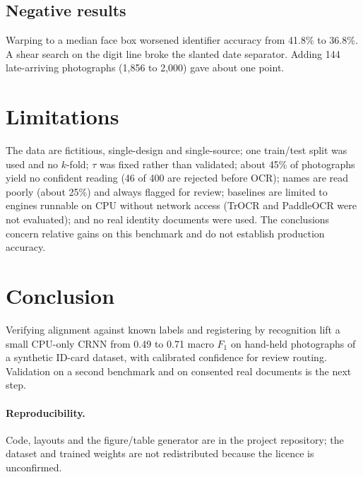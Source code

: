 \documentclass[11pt,a4paper]{article}
\newcommand{\Fone}{F_1}
\begin{document}
\subsection{Negative results}
Warping to a median face box worsened identifier accuracy from 41.8\% to 36.8\%. A shear search on the digit line broke the slanted date separator. Adding 144 late-arriving photographs (1{,}856 to 2{,}000) gave about one point.

\section{Limitations}
The data are fictitious, single-design and single-source; one train/test split was used and no $k$-fold; $\tau$ was fixed rather than validated; about 45\% of photographs yield no confident reading (46 of 400 are rejected before OCR); names are read poorly (about 25\%) and always flagged for review; baselines are limited to engines runnable on CPU without network access (TrOCR and PaddleOCR were not evaluated); and no real identity documents were used. The conclusions concern relative gains on this benchmark and do not establish production accuracy.

\section{Conclusion}
Verifying alignment against known labels and registering by recognition lift a small CPU-only CRNN from 0.49 to 0.71 macro $\Fone$ on hand-held photographs of a synthetic ID-card dataset, with calibrated confidence for review routing. Validation on a second benchmark and on consented real documents is the next step.

\paragraph{Reproducibility.} Code, layouts and the figure/table generator are in the project repository; the dataset and trained weights are not redistributed because the licence is unconfirmed.



\end{document}
